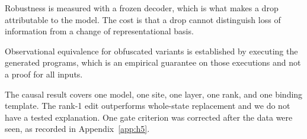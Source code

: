 \documentclass{article}
\begin{document}
Robustness is measured with a frozen decoder, which is what makes a drop attributable to the model. The cost is that a drop cannot distinguish loss of information from a change of representational basis.

Observational equivalence for obfuscated variants is established by executing the generated programs, which is an empirical guarantee on those executions and not a proof for all inputs.

The causal result covers one model, one site, one layer, one rank, and one binding template. The rank-1 edit outperforms whole-state replacement and we do not have a tested explanation. One gate criterion was corrected after the data were seen, as recorded in Appendix~\ref{app:h5}.



\end{document}
